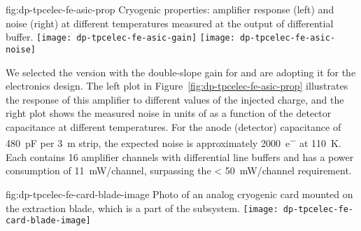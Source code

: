 \begin{dunefigure}{fig:dp-tpcelec-fe-asic-prop}
{Cryogenic   properties: amplifier response (left) and noise (right) at different temperatures measured at the output of differential buffer.}
\texttt{[image: dp-tpcelec-fe-asic-gain]}
\texttt{[image: dp-tpcelec-fe-asic-noise]}
\end{dunefigure}

We selected the  version with the double-slope gain for  and are adopting it for the \dual {} electronics design. The left plot in Figure~\ref{fig:dp-tpcelec-fe-asic-prop} illustrates the response of this amplifier to different values of the injected charge, and the right plot shows the measured noise in units of  as a function of the detector capacitance at different temperatures. For the  anode (detector) capacitance of \SI{480}{\pico\farad} per \SI{3}{\metre} strip, the expected noise is approximately \SI{2000}{e^{-}} at \SI{110}{\kelvin}. Each  contains \num{16} amplifier channels with differential line buffers and has a power consumption of \SI{11}{\milli\watt/channel}, surpassing the \SI{< 50}{\milli\watt/channel} requirement. 


\begin{dunefigure}{fig:dp-tpcelec-fe-card-blade-image}
{Photo of an analog cryogenic  card mounted on the extraction blade, which is a part of the  subsystem.}
\texttt{[image: dp-tpcelec-fe-card-blade-image]}
\end{dunefigure}

